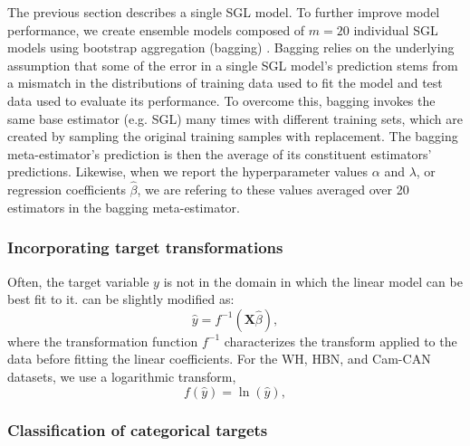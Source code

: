 \documentclass[10pt,letterpaper]{article}
\begin{document}
The previous section describes a single SGL model. To further improve model
performance, we create ensemble models composed of $m = 20$ individual SGL
models using bootstrap aggregation (bagging) \cite{breiman1996bagging}.
Bagging relies on the underlying assumption that some of the error in a
single SGL model's prediction stems from a mismatch in the distributions of
training data used to fit the model and test data used to evaluate its
performance. To overcome this, bagging invokes the same base estimator (e.g.
SGL) many times with different training sets, which are created by sampling
the original training samples with replacement. The bagging meta-estimator's
prediction is then the average of its constituent estimators' predictions.
Likewise, when we report the hyperparameter values $\alpha$ and $\lambda$, or
regression coefficients $\hat{\beta}$, we are refering to these values
averaged over 20 estimators in the bagging meta-estimator.

\subsubsection*{Incorporating target transformations}

Often, the target variable $y$ is not in the domain in which the linear
model can be best fit to it.  can be slightly
modified as:
\begin{equation}
    \hat{y} = f^{-1} \left( \mathbf{X} \hat{\beta} \right),
    \label{eq:lm-transform}
\end{equation}
where the transformation function $f^{-1}$ characterizes the transform
applied to the data before fitting the linear coefficients.
For  the WH, HBN, and Cam-CAN datasets, we use a
logarithmic transform,
\begin{equation}
    f \left( \hat{y} \right) = \ln \left( \hat{y} \right),
    \label{eq:log-nonlinearity}
\end{equation}

\subsubsection*{Classification of categorical targets}
\end{document}
